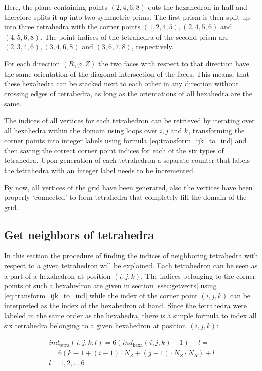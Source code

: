 \documentclass[./main.tex]{subfiles}
\begin{document}
Here, the plane containing points $(2,4,6,8)$ cuts the hexahedron in half and therefore splits it up into two symmetric prims. The first prism is then split up into three tetrahedra with the corner points $(1,2,4,5),(2,4,5,6)$ and $(4,5,6,8)$.
The point indices of the tetrahedra of the second prism are $(2,3,4,6),(3,4,6,8)$ and $(3,6,7,8)$, respectively. 

For each direction $(R,\varphi,Z)$ the two faces with respect to that direction have the same orientation of the diagonal intersection of the faces. This means, that these hexahedra can be stacked next to each other in any direction without crossing edges of tetrahedra, as long as the orientations of all hexahedra are the same. 

The indices of all vertices for each tetrahedron can be retrieved by iterating over all hexahedra within the domain using loops over $i,j$ and $k$, transforming the corner points into integer labels using formula \ref{eq:transform_ijk_to_ind} and then saving the correct corner point indices for each of the six types of tetrahedra. Upon generation of each tetrahedron a separate counter that labels the tetrahedra with an integer label needs to be incremented.

By now, all vertices of the grid have been generated, also the vertices have been properly \enquote*{connected} to form tetrahedra that completely fill the domain of the grid.

\subsection{Get neighbors of tetrahedra}
In this section the procedure of finding the indices of neighboring tetrahedra with respect to a given tetrahedron will be explained.\newline
Each tetrahedron can be seen as a part of a hexahedron at position $(i,j,k)$. The indices belonging to the corner points of such a hexahedron are given in section \ref{ssec:getverts} using \ref{eq:transform_ijk_to_ind} while the index of the corner point $(i,j,k)$ can be interpreted as the index of the hexahedron at hand. Since the tetrahedra were labeled in the same order as the hexahedra, there is a simple formula to index all six tetrahedra belonging to a given hexahedron at position $(i,j,k)$:

\begin{eqnarray}\label{eq:ind_tetra}
ind_\text{tetra}(i,j,k,l) = 6(ind_\text{hexa}(i,j,k)-1)+l = \\
\nonumber
= 6(k-1 + (i-1)\cdot N_Z + (j-1)\cdot N_Z\cdot N_R)+l\\
l = 1,2,..,6
\end{eqnarray}
\end{document}
